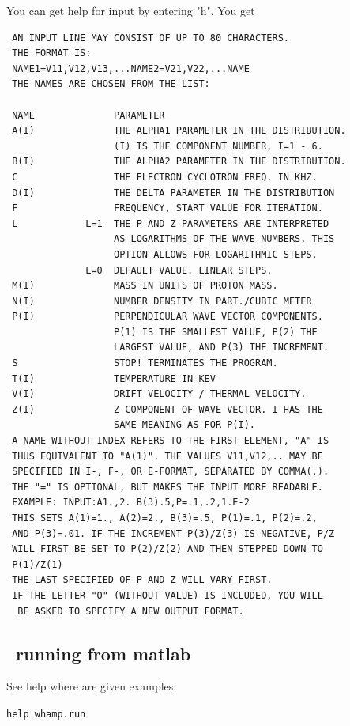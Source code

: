 \documentclass[a4,10pt]{article}
\begin{document}
You can get help for input by entering "h". You get
\begin{verbatim}
 AN INPUT LINE MAY CONSIST OF UP TO 80 CHARACTERS.
 THE FORMAT IS:
 NAME1=V11,V12,V13,...NAME2=V21,V22,...NAME
 THE NAMES ARE CHOSEN FROM THE LIST:

 NAME              PARAMETER
 A(I)              THE ALPHA1 PARAMETER IN THE DISTRIBUTION.
                   (I) IS THE COMPONENT NUMBER, I=1 - 6.
 B(I)              THE ALPHA2 PARAMETER IN THE DISTRIBUTION.
 C                 THE ELECTRON CYCLOTRON FREQ. IN KHZ.
 D(I)              THE DELTA PARAMETER IN THE DISTRIBUTION
 F                 FREQUENCY, START VALUE FOR ITERATION.
 L            L=1  THE P AND Z PARAMETERS ARE INTERPRETED
                   AS LOGARITHMS OF THE WAVE NUMBERS. THIS
                   OPTION ALLOWS FOR LOGARITHMIC STEPS.
              L=0  DEFAULT VALUE. LINEAR STEPS.
 M(I)              MASS IN UNITS OF PROTON MASS.
 N(I)              NUMBER DENSITY IN PART./CUBIC METER
 P(I)              PERPENDICULAR WAVE VECTOR COMPONENTS.
                   P(1) IS THE SMALLEST VALUE, P(2) THE
                   LARGEST VALUE, AND P(3) THE INCREMENT.
 S                 STOP! TERMINATES THE PROGRAM.
 T(I)              TEMPERATURE IN KEV
 V(I)              DRIFT VELOCITY / THERMAL VELOCITY.
 Z(I)              Z-COMPONENT OF WAVE VECTOR. I HAS THE
                   SAME MEANING AS FOR P(I).
 A NAME WITHOUT INDEX REFERS TO THE FIRST ELEMENT, "A" IS
 THUS EQUIVALENT TO "A(1)". THE VALUES V11,V12,.. MAY BE
 SPECIFIED IN I-, F-, OR E-FORMAT, SEPARATED BY COMMA(,).
 THE "=" IS OPTIONAL, BUT MAKES THE INPUT MORE READABLE.
 EXAMPLE: INPUT:A1.,2. B(3).5,P=.1,.2,1.E-2
 THIS SETS A(1)=1., A(2)=2., B(3)=.5, P(1)=.1, P(2)=.2,
 AND P(3)=.01. IF THE INCREMENT P(3)/Z(3) IS NEGATIVE, P/Z
 WILL FIRST BE SET TO P(2)/Z(2) AND THEN STEPPED DOWN TO
 P(1)/Z(1)
 THE LAST SPECIFIED OF P AND Z WILL VARY FIRST.
 IF THE LETTER "O" (WITHOUT VALUE) IS INCLUDED, YOU WILL
  BE ASKED TO SPECIFY A NEW OUTPUT FORMAT.

\end{verbatim}

\subsection{\WHAMP\ running from matlab}
See help where are given examples: 

\texttt{help whamp.run}
\end{document}
